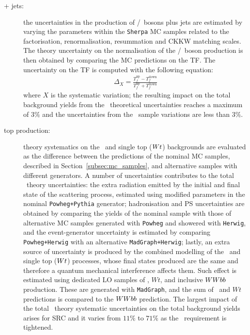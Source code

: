 			\begin{description}
				\item [ + jets:] the uncertainties in the production of \Wboson/\Zboson\ bosons plus jets are estimated by varying the parameters within the \texttt{Sherpa} \ac{MC} samples related to the factorisation, renormalisation, resummation and \ac{CKKW} matching scales. The theory uncertainty on the normalisation of the \Wboson/\Zboson\ boson production is then obtained by comparing the \ac{MC} predictions on the \ac{TF}. The uncertainty on the \ac{TF} is computed with the following equation: 
				\begin{eqnarray}
    				\Delta_{X} = \frac{T_f^{\mathrm{up}} - T_f^{\mathrm{down}}}{T_f^{\mathrm{up}} + T_f^{\mathrm{down}}}
    			\label{eq:theory_uncertainty}
				\end{eqnarray}
				\noindent where $X$ is the systematic variation; the resulting impact on the total background yields from the \Zjets\ theoretical uncertainties reaches a maximum of $3\%$ and the uncertainties from the \Wjets\ sample variations are less than $3\%$.

				\item [top production:] theory systematics on the \ttbar\ and single top ($W t$) backgrounds are evaluated as the difference between the predictions of the nominal \ac{MC} samples, described in Section~\ref{subsec:mc_samples}, and alternative samples with different generators. A number of uncertainties contributes to the total \ttbar\ theory uncertainties: the extra radiation emitted by the initial and final state of the scattering process, estimated using modified parameters in the nominal \texttt{Powheg+Pythia} generator; hadronisation and \ac{PS} uncertainties are obtained by comparing the yields of the nominal sample with those of alternative \ac{MC} samples generated with \texttt{Powheg} and showered with \texttt{Herwig}, and the event-generator uncertainty is estimated by comparing \texttt{Powheg+Herwig} with an alternative \texttt{MadGraph+Herwig}; lastly, an extra source of uncertainty is produced by the combined modelling of the \ttbar\ and single top ($W t$) processes, whose final states produced are the same and therefore a quantum mechanical interference affects them. Such effect is estimated using dedicated \ac{LO} samples of \ttbar, $Wt$, and inclusive $WW bb$ production. These are generated with \texttt{MadGraph}, and the sum of \ttbar\ and $Wt$ predictions is compared to the $WW bb$ prediction. The largest impact of the total \ttbar\ theory systematic uncertainties on the total background yields arises for SRC and it varies from $11\%$ to $71\%$ as the \rISR\ requirement is tightened.


\end{description}
